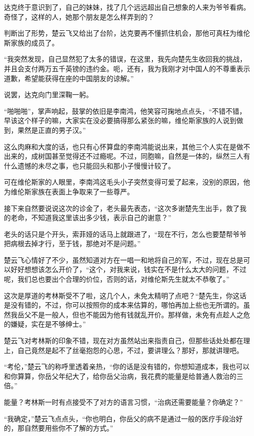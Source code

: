 达克终于意识到了，自己的妹妹，找了几个远远超出自己想象的人来为爷爷看病。奇怪了，这样的人，她那个朋友是怎么样弄到的？

判断出了形势，楚云飞又给出了台阶，达克要再不懂抓住机会，那他可真枉为维伦斯家族的成员了。

“我突然发现，自己显然犯了太多的错误，在这里，我先向楚先生收回我的挑战，并且会支付两万五千英镑的违约金。呃，还有，我为我刚才对中国人的不尊重表示道歉，希望能获得在座的中国朋友的谅解。”

说罢，达克向门里深鞠一躬。

“啪啪啪”，掌声响起，鼓掌的依旧是李南鸿，他笑容可掬地点点头，“不错不错，早该这个样子的嘛，大家实在没必要搞得那么紧张的嘛，维伦斯家族的人说到做到，果然是正直的男子汉。”

这么肉麻和大度的话，也只有心怀算盘的李南鸿能说出来，其他三个人实在是做不出来的，成树国甚至觉得还不过瘾呢。不过，同胞嘛，自然是一体的，纵然三人有什么遗憾的未尽之事，也只能回头和那小子慢慢计较了。

可在维伦斯家的人眼里，李南鸿这毛头小子突然变得可爱了起来，没别的原因，他为维伦斯家族在表面上争取来了一些尊严。

接下来自然要说说这次的诊金了，老头最先表态，“这次多谢楚先生出手，救了我的老命，不知道我这里该出多少钱，表示自己的谢意？”

老头的话只是个开头，索菲娅的话马上就跟进了，“现在不行，怎么也要楚帮爷爷把病根去掉才行，至于钱，那绝对不是问题。”

楚云飞心情好了不少，虽然知道对方在一唱一和地将自己的军，不过，现在总是可以好好想想该怎么开价了，“这个，对我来说，钱实在不是什么太大的问题，不过呢，我们总也要出个合理的价位，否则的话，对维伦斯先生就太不恭敬了。”

这次是厚道的考林斯受不了啦，这几个人，未免太精明了点吧？“楚先生，你这话是没有错的，不过，你可以按照你的成本来估算的，哪怕再加上些也无所谓的。虽然我岳父不是一般人，但也不能因为他有钱就乱开价。那样做，未免有点趁人之危的嫌疑，实在是不够绅士。”

楚云飞对考林斯的印象不错，现在对方虽然站出来指责自己，但那些话处处都在理上，自己竟然是起不了丝毫抱怨的心思，不过，要讲理么？那好，那就讲理吧。

“考伦，”楚云飞的称呼里透着亲热，“你的话是没有错的，你想知道成本，我也可以和你算算，你岳父年纪大了，给你岳父治病，我花费的能量是给普通人救治的三倍。”

能量？考林斯一时有点接受不了对方的语言习惯，“治病还需要能量？你确定？”

“我确定，”楚云飞点点头，“你也明白，你岳父的病不是通过一般的医疗手段治好的，那自然要用些你不了解的方式。”

